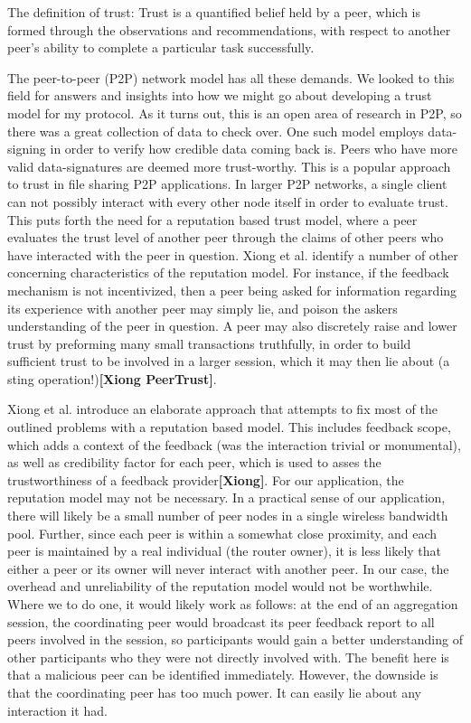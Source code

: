 \documentclass[12pt]{article}
\newcommand{\lcite}[1]
{{\bfseries\color{orange}[#1]}}
\begin{document}
			The definition of trust: Trust is a quantified belief held by a peer, which is formed through the observations and recommendations, with respect to another peer’s ability to complete a particular task successfully. 

			The peer-to-peer (P2P) network model has all these demands. We looked to this field for answers and insights into how we might go about developing a trust model for my protocol. As it turns out, this is an open area of research in P2P, so there was a great collection of data to check over. One such model employs data-signing in order to verify how credible data coming back is. Peers who have more valid data-signatures are deemed more trust-worthy. This is a popular approach to trust in file sharing P2P applications. In larger P2P networks, a single client can not possibly interact with every other node itself in order to evaluate trust. This puts forth the need for a reputation based trust model, where a peer evaluates the trust level of another peer through the claims of other peers who have interacted with the peer in question. Xiong et al. identify a number of other concerning characteristics of the reputation model. For instance, if the feedback mechanism is not incentivized, then a peer being asked for information regarding its experience with another peer may simply lie, and poison the askers understanding of the peer in question. A peer may also discretely raise and lower trust by preforming many small transactions truthfully, in order to build sufficient trust to be involved in a larger session, which it may then lie about (a sting operation!)\lcite{Xiong PeerTrust}.

			Xiong et al. introduce an elaborate approach that attempts to fix most of the outlined problems with a reputation based model. This includes feedback scope, which adds a context of the feedback (was the interaction trivial or monumental), as well as credibility factor for each peer, which is used to asses the trustworthiness of a feedback provider\lcite{Xiong}. For our application, the reputation model may not be necessary. In a practical sense of our application, there will likely be a small number of peer nodes in a single wireless bandwidth pool. Further, since each peer is within a somewhat close proximity, and each peer is maintained by a real individual (the router owner), it is less likely that either a peer or its owner will never interact with another peer. In our case, the overhead and unreliability of the reputation model would not be worthwhile. Where we to do one, it would likely work as follows: at the end of an aggregation session, the coordinating peer would broadcast its peer feedback report to all peers involved in the session, so participants would gain a better understanding of other participants who they were not directly involved with. The benefit here is that a malicious peer can be identified immediately. However, the downside is that the coordinating peer has too much power. It can easily lie about any interaction it had.
\end{document}
